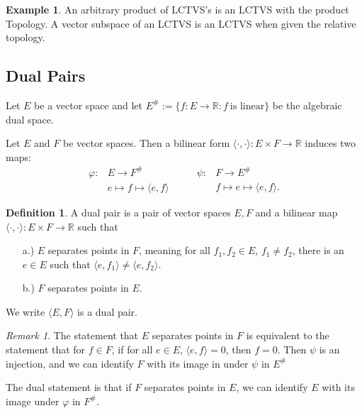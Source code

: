 \documentclass[11pt, reqno]{article}
\theoremstyle{plain}
\theoremstyle{definition}
\newtheorem*{definition}{Definition}
\newtheorem*{example}{Example}
\theoremstyle{remark}
\newtheorem*{remark}{Remark}
\newcommand{\RR}{\mathbb{R}}
\begin{document}
\begin{example}
    An arbitrary product of LCTVS's is an LCTVS with the product Topology. A vector subspace of an LCTVS is 
    an LCTVS when given the relative topology.
\end{example}

\subsection*{Dual Pairs}

Let $E$ be a vector space and let $E^{\#} := \{f: E \rightarrow \RR: f\ \textrm{is linear}\}$ be the algebraic dual space.

Let $E$ and $F$ be vector spaces. Then a bilinear form $\langle \cdot, \cdot \rangle: E \times F \rightarrow \RR$ induces 
two maps:
\begin{equation*}
    \begin{split}
        \varphi: &E \rightarrow F^\#\\
            &e \mapsto f \mapsto \langle e, f\rangle
    \end{split} \qquad 
    \begin{split}
        \psi: & F \rightarrow E^\#\\
            & f \mapsto e \mapsto \langle e,f \rangle.
    \end{split}
\end{equation*}

\begin{definition}
    A dual pair is a pair of vector spaces $E, F$ and a bilinear map $\langle \cdot, \cdot \rangle: E \times F \rightarrow \RR$
    such that 
    \begin{enumerate}
        \item[a.)] $E$ separates points in $F$, meaning for all $f_1, f_2 \in E$, $f_1 \neq f_2$, there is an $e \in E$
        such that $\langle e, f_1\rangle \neq \langle e, f_2\rangle$.
        \item[b.)] $F$ separates points in $E$.
    \end{enumerate}
    We write $\langle E, F\rangle$ is a dual pair. 
\end{definition}

\begin{remark}
    The statement that $E$ separates points in $F$ is equivalent to the statement that for $f \in F$, if for all $e \in E$, 
    $\langle e, f \rangle = 0$, then $f = 0$. Then $\psi$ is an injection, and we can identify $F$ with its image 
    in under $\psi$ in $E^\#$

    The dual statement is that if $F$ separates points in $E$, we can identify $E$ with its image under $\varphi$ in $F^\#$.
\end{remark}
\end{document}
